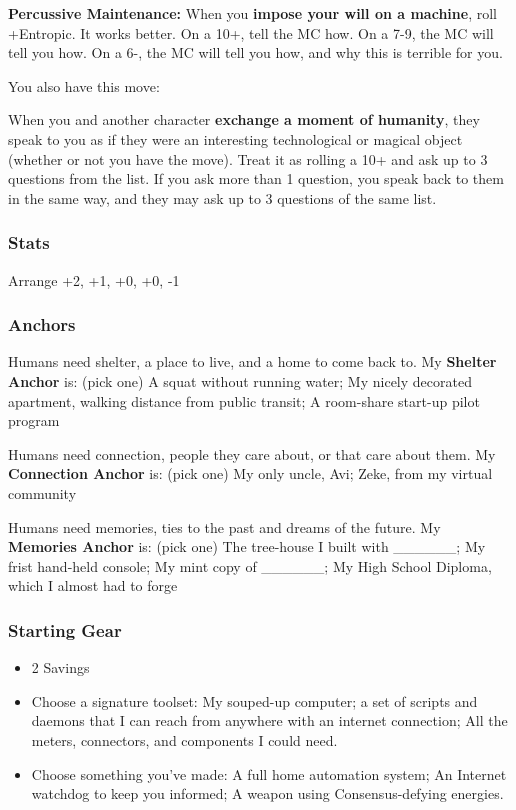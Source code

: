 \documentclass[
]{article}
\providecommand{\tightlist}{%
  \setlength{\itemsep}{0pt}\setlength{\parskip}{0pt}}
\begin{document}
\textbf{Percussive Maintenance:} When you \textbf{impose your will on a
machine}, roll +Entropic. It works better. On a 10+, tell the MC how. On
a 7-9, the MC will tell you how. On a 6-, the MC will tell you how, and
why this is terrible for you.

You also have this move:

When you and another character \textbf{exchange a moment of humanity},
they speak to you as if they were an interesting technological or
magical object (whether or not you have the move). Treat it as rolling a
10+ and ask up to 3 questions from the list. If you ask more than 1
question, you speak back to them in the same way, and they may ask up to
3 questions of the same list.

\hypertarget{stats-7}{%
\subsubsection{Stats}\label{stats-7}}

Arrange +2, +1, +0, +0, -1

\hypertarget{anchors-6}{%
\subsubsection{Anchors}\label{anchors-6}}

Humans need shelter, a place to live, and a home to come back to. My
\textbf{Shelter Anchor} is: (pick one) A squat without running water; My
nicely decorated apartment, walking distance from public transit; A
room-share start-up pilot program

Humans need connection, people they care about, or that care about them.
My \textbf{Connection Anchor} is: (pick one) My only uncle, Avi; Zeke,
from my virtual community

Humans need memories, ties to the past and dreams of the future. My
\textbf{Memories Anchor} is: (pick one) The tree-house I built with
\_\_\_\_\_\_; My frist hand-held console; My mint copy of \_\_\_\_\_\_;
My High School Diploma, which I almost had to forge

\hypertarget{starting-gear-6}{%
\subsubsection{Starting Gear}\label{starting-gear-6}}

\begin{itemize}
\tightlist
\item
  2 Savings
\item
  Choose a signature toolset: My souped-up computer; a set of scripts
  and daemons that I can reach from anywhere with an internet
  connection; All the meters, connectors, and components I could need.
\item
  Choose something you've made: A full home automation system; An
  Internet watchdog to keep you informed; A weapon using
  Consensus-defying energies.
\end{itemize}
\end{document}
